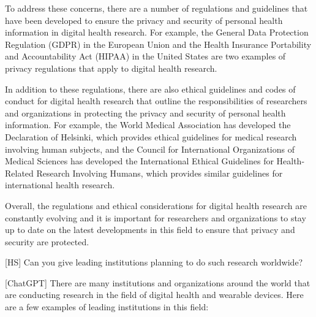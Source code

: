 \documentclass[
]{book}
\theoremstyle{definition}
\theoremstyle{definition}
\theoremstyle{definition}
\theoremstyle{definition}
\theoremstyle{remark}
\begin{document}
To address these concerns, there are a number of regulations and guidelines that have been developed to ensure the privacy and security of personal health information in digital health research. For example, the General Data Protection Regulation (GDPR) in the European Union and the Health Insurance Portability and Accountability Act (HIPAA) in the United States are two examples of privacy regulations that apply to digital health research.

In addition to these regulations, there are also ethical guidelines and codes of conduct for digital health research that outline the responsibilities of researchers and organizations in protecting the privacy and security of personal health information. For example, the World Medical Association has developed the Declaration of Helsinki, which provides ethical guidelines for medical research involving human subjects, and the Council for International Organizations of Medical Sciences has developed the International Ethical Guidelines for Health-Related Research Involving Humans, which provides similar guidelines for international health research.

Overall, the regulations and ethical considerations for digital health research are constantly evolving and it is important for researchers and organizations to stay up to date on the latest developments in this field to ensure that privacy and security are protected.

{[}HS{]} Can you give leading institutions planning to do such research worldwide?

{[}ChatGPT{]} There are many institutions and organizations around the world that are conducting research in the field of digital health and wearable devices. Here are a few examples of leading institutions in this field:
\end{document}
